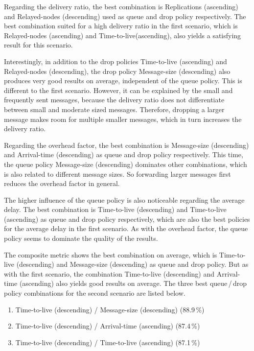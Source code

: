 \documentclass[conference,10pt,letterpaper,final]{IEEEtran}
\begin{document}
Regarding the delivery ratio, the best combination is Replications (ascending) and Relayed-nodes (descending) used as queue and drop policy respectively.
The best combination suited for a high delivery ratio in the first scenario, which is Relayed-nodes (ascending) and Time-to-live(ascending), also yields a satisfying result for this scenario.

Interestingly, in addition to the drop policies Time-to-live (ascending) and Relayed-nodes (descending), the drop policy Message-size (descending) also produces very good results on average, independent of the queue policy.
This is different to the first scenario. However, it can be explained by the small and frequently sent messages, because the delivery ratio does not differentiate between small and moderate sized messages.
Therefore, dropping a larger message makes room for multiple smaller messages, which in turn increases the delivery ratio.


Regarding the overhead factor, the best combination is Message-size (descending) and Arrival-time (descending) as queue and drop policy respectively.
This time, the queue policy Message-size (descending) dominates other combinations, which is also related to different message sizes.
So forwarding larger messages first reduces the overhead factor in general.


The higher influence of the queue policy is also noticeable regarding the average delay.
The best combination is Time-to-live (descending) and Time-to-live (ascending) as queue and drop policy respectively, which are also the best policies for the average delay in the first scenario.
As with the overhead factor, the queue policy seems to dominate the quality of the results.


The composite metric shows the best combination on average, which is Time-to-live (descending) and Message-size (descending) as queue and drop policy.
But as with the first scenario, the combination Time-to-live (descending) and Arrival-time (ascending) also yields good results on average.
The three best queue\,/\,drop policy combinations for the second scenario are listed below.

\begin{enumerate}
 \item Time-to-live (descending) / Message-size (descending) (88.9\,\%)
 \vspace{0.1cm}
 \item Time-to-live (descending) / Arrival-time (ascending) (87.4\,\%)
 \vspace{0.1cm}
 \item Time-to-live (descending) / Time-to-live (ascending) (87.1\,\%)
 \vspace{0.1cm}
\end{enumerate}
\end{document}
